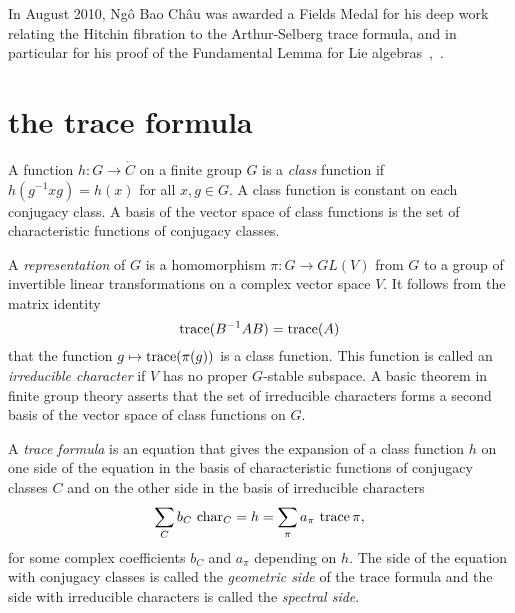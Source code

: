 \def\tikzfig#1#2#3{%
\begin{figure}[htb]%
  \centering
\begin{tikzpicture}#3
\end{tikzpicture}
  \caption{#2}
  \label{fig:#1}%
\end{figure}%
}


\def\gg{\mathfrak{g}}
\def\cc{\mathfrak{c}}
\def\AA{{\mathcal A}}
\def\MM{{\mathcal M}}
\def\OO{{\mathcal O}}
\def\XX{$\langle\text{\it insert}\rangle$}

In August 2010, Ng\^o Bao Ch\^au was awarded a Fields Medal for his
deep work relating the Hitchin fibration to the Arthur-Selberg trace
formula, and in particular for his proof of the Fundamental Lemma for
Lie algebras~\cite{NBC:2006},~\cite{NBC:2010}.


\section{the trace formula}

A function $h:G\to\ring{C}$ on a finite group $G$ is a {\it class} function
if $h(g^{-1} x g) = h(x)$ for all $x,g\in G$.  A class
function is constant on each conjugacy class.  A basis of the
vector space of class functions is the set of characteristic functions
of conjugacy classes.

A {\it representation} of $G$ is a homomorphism $\pi:G\to GL(V)$ from $G$
to a group of invertible linear transformations on a complex vector
space $V$.  It follows from the matrix identity 
\[
{\operatorname{trace}}( B^{-1} A B) = {\operatorname{trace}} (A)
\]
that the function $g\mapsto {\operatorname{trace}}(\pi(g))$
is a class function.  This function is called an
{\it irreducible character} if $V$ has no proper $G$-stable subspace.
A basic theorem in finite group theory asserts that the set of
irreducible characters forms a second basis of the vector space of
class functions on $G$. 

A {\it trace formula} is an equation that gives the expansion of a
class function $h$ on one side of the equation in the basis of
characteristic functions of conjugacy classes $C$ and on the other
side in the basis of irreducible characters
\[
\sum_C b_C\ {\operatorname{char}}_C     =  h = \sum_\pi a_\pi\ {\operatorname{trace}}\, \pi,
\]
for some complex coefficients $b_C$ and $a_\pi$ depending on $h$.
The side of the equation with conjugacy classes is called the {\it
  geometric side} of the trace formula and the side with irreducible
characters is called the {\it spectral side}.

